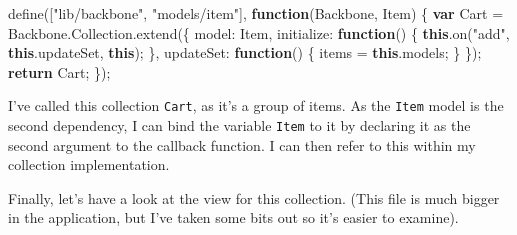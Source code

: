 \documentclass[9pt]{book}
\newenvironment{Shaded}{}{}
\newcommand{\KeywordTok}[1]{\textcolor[rgb]{0.00,0.44,0.13}{\textbf{{#1}}}}
\newcommand{\DataTypeTok}[1]{\textcolor[rgb]{0.56,0.13,0.00}{{#1}}}
\newcommand{\StringTok}[1]{\textcolor[rgb]{0.25,0.44,0.63}{{#1}}}
\newcommand{\OtherTok}[1]{\textcolor[rgb]{0.00,0.44,0.13}{{#1}}}
\newcommand{\FunctionTok}[1]{\textcolor[rgb]{0.02,0.16,0.49}{{#1}}}
\newcommand{\NormalTok}[1]{{#1}}
\begin{document}
\begin{Shaded}
\begin{Highlighting}[]
\FunctionTok{define}\NormalTok{([}\StringTok{"lib/backbone"}\NormalTok{, }\StringTok{"models/item"}\NormalTok{], }\KeywordTok{function}\NormalTok{(Backbone, Item) \{}
  \KeywordTok{var} \NormalTok{Cart = }\OtherTok{Backbone}\NormalTok{.}\OtherTok{Collection}\NormalTok{.}\FunctionTok{extend}\NormalTok{(\{}
    \DataTypeTok{model}\NormalTok{: Item,}
    \DataTypeTok{initialize}\NormalTok{: }\KeywordTok{function}\NormalTok{() \{}
      \KeywordTok{this}\NormalTok{.}\FunctionTok{on}\NormalTok{(}\StringTok{"add"}\NormalTok{, }\KeywordTok{this}\NormalTok{.}\FunctionTok{updateSet}\NormalTok{, }\KeywordTok{this}\NormalTok{);}
    \NormalTok{\},}
    \DataTypeTok{updateSet}\NormalTok{: }\KeywordTok{function}\NormalTok{() \{}
      \NormalTok{items = }\KeywordTok{this}\NormalTok{.}\FunctionTok{models}\NormalTok{;}
    \NormalTok{\}}
  \NormalTok{\});}
  \KeywordTok{return} \NormalTok{Cart;}
\NormalTok{\});}
\end{Highlighting}
\end{Shaded}

I've called this collection \texttt{Cart}, as it's a group of items. As
the \texttt{Item} model is the second dependency, I can bind the
variable \texttt{Item} to it by declaring it as the second argument to
the callback function. I can then refer to this within my collection
implementation.

Finally, let's have a look at the view for this collection. (This file
is much bigger in the application, but I've taken some bits out so it's
easier to examine).
\end{document}
